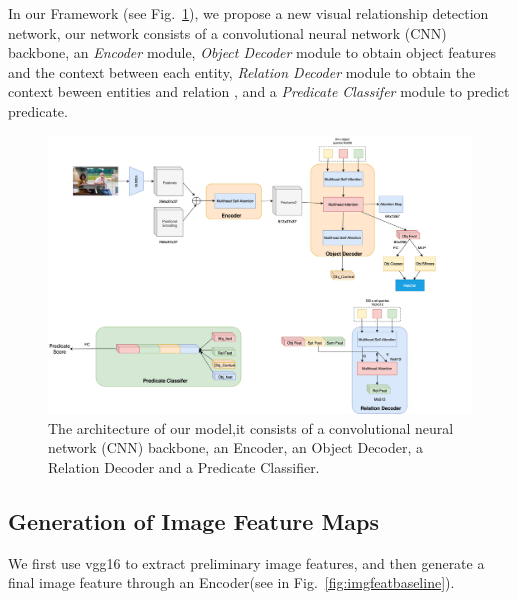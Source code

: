 In our Framework (see Fig.~\ref{fig:my_model}), we propose a new visual relationship detection network, our network consists of a convolutional neural network (CNN) backbone, an \textit{Encoder} module, \textit{Object Decoder} module to obtain object features and  the context between each entity, \textit{Relation Decoder} module to obtain the context beween entities and relation  , and a \textit{Predicate Classifer} module to predict predicate.

\begin{figure}[!htbp]
	\centering
	\includegraphics[width = 1\textwidth]{figures/my_model.png}
	\caption[The architecture of our model.]
	{The architecture of our model,it consists of a convolutional neural network (CNN) backbone, an Encoder, an Object Decoder, a Relation Decoder and a Predicate Classifier.}
	\label{fig:my_model}
\end{figure}


\subsection{Generation of Image Feature Maps }

We first use vgg16 to extract preliminary image features, and then generate a final image feature through an Encoder(see in Fig.~\ref{fig:imgfeatbaseline}).

